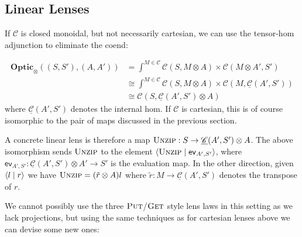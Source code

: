 \documentclass[11pt,a4paper]{article}
\theoremstyle{plain}
\theoremstyle{definition}
\newcommand{\C}{\mathscr{C}}
\newcommand{\homC}{\underline{\C}}
\newcommand{\Optic}{\mathbf{Optic}}
\newcommand{\rep}[2]{{\ensuremath \left\langle #1 \mid #2 \right\rangle}}
\newcommand{\fget}{\textsc{Get}}
\newcommand{\fput}{\textsc{Put}}
\newcommand{\funzip}{\textsc{Unzip}}
\begin{document}
\subsection{Linear Lenses}\label{sec:linear-lenses}
\newcommand{\ev}{\mathsf{ev}}
\newcommand{\coev}{\mathsf{coev}}

If $\C$ is closed monoidal, but not necessarily cartesian, we can use the tensor-hom adjunction to eliminate the coend:

\begin{align*}
  \Optic_\otimes((S, S'), (A, A')) &= \int^{M \in \C} \C(S, M \otimes A) \times \C(M \otimes A', S') \\
                                   &\cong \int^{M \in \C} \C(S, M \otimes A) \times \C(M, \homC(A',S')) \\
                                   &\cong \C(S, \homC(A',S') \otimes A)
\end{align*}
where $\homC(A', S')$ denotes the internal hom. If $\C$ is cartesian, this is of course isomorphic to the pair of maps discussed in the previous section.

A concrete linear lens is therefore a map $\funzip : S \to \homC(A',S') \otimes A$. The above isomorphism sends $\funzip$ to the element $\rep{\funzip}{\ev_{A', S'}}$, where $\ev_{A', S'} : \homC(A',S') \otimes A' \to S'$ is the evaluation map. In the other direction, given $\rep{l}{r}$ we have $\funzip = (\tilde r \otimes A)l$ where $\tilde r : M \to \homC(A', S')$ denotes the transpose of $r$.

We cannot possibly use the three $\fput$/$\fget$ style lens laws in this setting as we lack projections, but using the same techniques as for cartesian lenses above we can devise some new ones:
\end{document}
